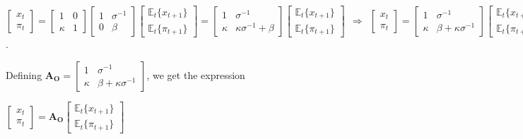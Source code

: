 \documentclass[
]{article}
\begin{document}
\(\displaystyle \left[ \begin{matrix} x_t\\ \pi_t \end{matrix} \right] = \left[ \begin{matrix} 1 & 0\\ \kappa & 1 \end{matrix} \right] \left[ \begin{matrix} 1 & \sigma^{-1} \\ 0 & \beta \end{matrix} \right] \left[ \begin{matrix} \mathbb{E}_t\{x_{t+1} \}\\ \mathbb{E}_t \{\pi_{t+1} \} \end{matrix} \right] = \left[ \begin{matrix} 1 & \sigma^{-1} \\ \kappa & \kappa \sigma^{-1}+ \beta \end{matrix} \right] \left[ \begin{matrix} \mathbb{E}_t\{x_{t+1} \}\\ \mathbb{E}_t \{\pi_{t+1} \} \end{matrix} \right] \ \ \Rightarrow \ \ \left[ \begin{matrix} x_t\\ \pi_t \end{matrix} \right] = \left[ \begin{matrix} 1 & \sigma^{-1} \\ \kappa & \beta +\kappa \sigma^{-1} \end{matrix} \right] \left[ \begin{matrix} \mathbb{E}_t\{x_{t+1} \}\\ \mathbb{E}_t \{\pi_{t+1} \} \end{matrix} \right]\).

Defining
\(\mathbf{A_O}=\left[ \begin{matrix} 1 & \sigma^{-1} \\ \kappa & \beta +\kappa \sigma^{-1} \end{matrix} \right]\),
we get the expression

\(\displaystyle \left[ \begin{matrix} x_t\\ \pi_t \end{matrix} \right] =\mathbf{A_O} \left[ \begin{matrix} \mathbb{E}_t\{x_{t+1} \}\\ \mathbb{E}_t \{\pi_{t+1} \} \end{matrix} \right]\)
\end{document}
